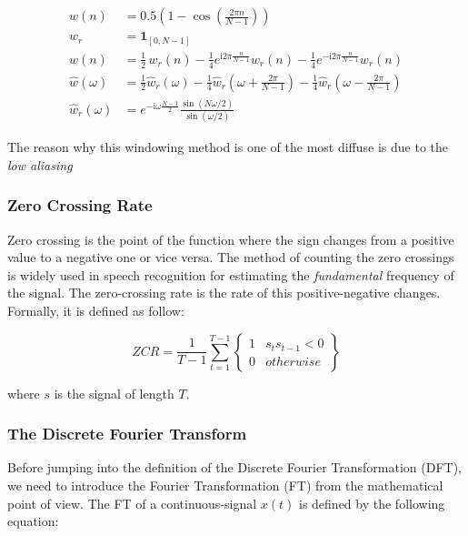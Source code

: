 \begin{subequations}
\label{eq:hann_function_equations}
\begin{align}
w(n) &= 0.5 \left(1 - \cos \left ( \frac{2 \pi n}{N-1} \right) \right) \label{eq:discrete_window_function} \\
w_r &= \mathbf{1}_{[0,N-1]} \label{eq:rectangular_function} \\
w(n) &= \frac{1}{2} \,w_r(n) -\frac{1}{4} e^{\mathrm{i}2\pi \frac{n}{N-1}} w_r(n) - \frac{1}{4}e^{-\mathrm{i}2\pi \frac{n}{N-1}} w_r(n) \label{eq:euler_formula} \\
\hat{w} (\omega) &= \frac{1}{2} \hat{w}_r (\omega) - \frac{1}{4} \hat{w}_r \left(\omega + \frac{2\pi}{N-1}\right) - \frac{1}{4} \hat{w}_r \left(\omega - \frac{2\pi}{N-1}\right) \label{eq:spectrum_ft} \\
\hat{w}_r (\omega) &= e^{-\mathrm{i} \omega \frac{N-1}{2}} \frac{\sin(N\omega/2)}{\sin(\omega/2)} \label{eq:final_hann}
\end{align}
\end{subequations}

\noindent The reason why this windowing method is one of the most diffuse is due to the \textit{low aliasing}

\subsubsection{Zero Crossing Rate}
\label{ssubs:Zero Crossing Rate}
Zero crossing is the point of the function where the sign changes from a positive value to a negative one or vice versa. The method of counting the zero crossings is widely used in speech recognition for estimating the \textit{fundamental} frequency of the signal. The zero-crossing rate is the rate of this positive-negative changes. Formally, it is defined as follow:

\begin{equation}
ZCR = \frac{1}{T-1} \sum_{t=1}^{T-1} \begin{Bmatrix}
										1  & s_t s_{t-1} < 0 \\
										0 & otherwise
									 \end{Bmatrix}
\end{equation}

\noindent where $s$ is the signal of length $T$.

\subsubsection{The Discrete Fourier Transform}
\label{ssubs:discrete_fourier_transform}
Before jumping into the definition of the Discrete Fourier Transformation (DFT), we need to introduce the Fourier Transformation (FT) from the mathematical point of view. The FT of a continuous-signal $x(t)$ is defined by the following equation:

